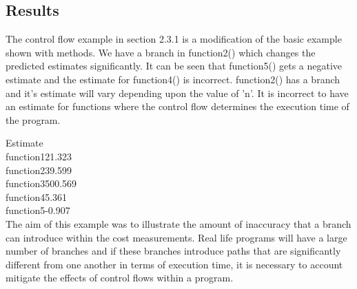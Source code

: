 \subsection{Results}
The control flow example in section 2.3.1 is a modification of the basic example shown with methods. We have a branch in function2() which changes the predicted estimates significantly. It can be seen that function5() gets a negative estimate and the estimate for function4() is incorrect. function2() has a branch and it's estimate will vary depending upon the value of 'n'. It is incorrect to have an estimate for functions where the control flow determines the execution time of the program.\newline


\hspace{6em}Estimate\\
function1\hspace{2em}21.323\\
function2\hspace{2em}39.599\\
function3\hspace{2em}500.569\\
function4\hspace{2em}5.361\\
function5\hspace{2em}-0.907\\

The aim of this example was to illustrate the amount of inaccuracy that a branch can introduce within the cost measurements. Real life programs will have a large number of branches and if these branches introduce paths that are significantly different from one another in terms of execution time, it is necessary to account mitigate the effects of control flows within a program. \newline
